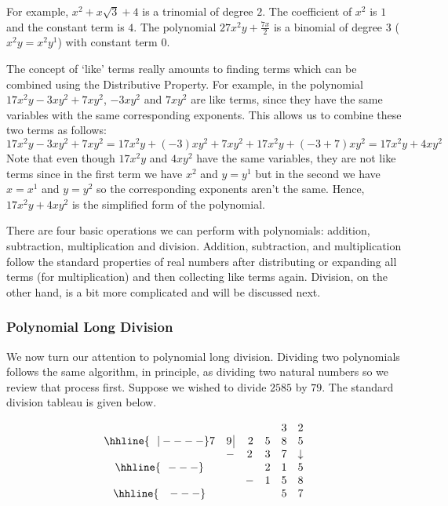 For example, $x^2 + x\sqrt{3} +4$ is a trinomial of degree $2$.  The coefficient of $x^2$ is $1$ and the constant term is $4$.  The polynomial $27x^2y + \frac{7x}{2}$ is a binomial of degree $3$ ($x^2y = x^2 y^1$) with constant term $0$.  

The concept of `like' terms really amounts to finding terms which can be combined using the Distributive Property.  For example, in the polynomial $17x^2y - 3xy^2 + 7xy^2$, $-3xy^2$ and $7xy^2$ are like terms, since they have the same variables with the same corresponding exponents. This allows us to combine these two terms as follows:  \[17x^2y -  3xy^2 + 7xy^2 = 17x^2y + (-3)xy^2 + 7xy^2 + 17x^2y +(-3 + 7)xy^2 = 17x^2y + 4xy^2\]  Note that even though $17x^2y$ and $4xy^2$ have the same variables, they are not like terms since in the first term we have $x^2$ and $y = y^1$ but in the second we have $x = x^1$ and $y = y^2$ so the corresponding exponents aren't the same.  Hence,  $17x^2y + 4xy^2$ is the simplified form of the polynomial.  

There are four basic operations we can perform with polynomials:  addition, subtraction, multiplication and division. Addition, subtraction, and multiplication follow the standard properties of real numbers after distributing or expanding all terms (for multiplication) and then collecting like terms again. Division, on the other hand, is a bit more complicated and will be discussed next.

\subsubsection{Polynomial Long Division}

We now turn our attention to polynomial long division.  Dividing two polynomials follows the same algorithm, in principle, as dividing two natural numbers so we review that process first.  Suppose we wished to divide $2585$ by $79$.  The standard division tableau is given below. 

\setlength\arraycolsep{0.1pt}
\setlength\extrarowheight{2pt}

\[ \begin{array}{cccccc}

    &             &      &    & 3   & 2  \\ \hhline{~~|----}

  7 & 9 \, \vline & \, 2 & 5 & 8 & 5  \\

    &            -&    2 & 3 & 7 & \downarrow \\ \hhline{~~---} 
    &             &      & 2 & 1 &  5   \\ 
    &             &     - & 1 & 5 & 8    \\ \hhline{~~~---} 
    &             &      &   & 5 & 7    \\

 
\end{array}\]

